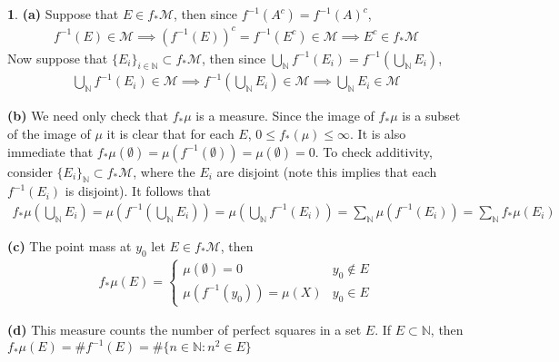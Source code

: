 \documentclass[10.5pt]{article}
\theoremstyle{definition}
\newtheorem{pb}{}
\newcommand{\set}[1]{\{#1\}}
\begin{document}
	\begin{pb}
		\textbf{(a)} Suppose that \(E \in f_* \mathcal{M}\), then since \(f^{-1}(A^c) = f^{-1}(A)^c\),
		\begin{align*}
			f^{-1}(E) \in \mathcal{M} \implies (f^{-1}(E))^c = f^{-1}(E^c) \in \mathcal{M} \implies E^c \in f_* \mathcal{M}
		\end{align*}
		Now suppose that \(\set{E_i}_{i \in \mathbb{N}} \subset f_* \mathcal{M}\), then since \(\bigcup_\mathbb{N} f^{-1}(E_i) = f^{-1}(\bigcup_\mathbb{N} E_i)\),
		\begin{align*}
			\bigcup_\mathbb{N} f^{-1}(E_i) \in \mathcal{M} \implies f^{-1}(\bigcup_\mathbb{N} E_i) \in \mathcal{M} \implies \bigcup_\mathbb{N} E_i \in \mathcal{M}
		\end{align*}

		\textbf{(b)} We need only check that \(f_*\mu\) is a measure. Since the image of \(f_*\mu\) is a subset of the image of \(\mu\) it is clear 
		that for each \(E\), \(0 \leq f_*(\mu) \leq \infty\). It is also immediate that \(f_*\mu(\emptyset) = \mu(f^{-1}(\emptyset)) = \mu(\emptyset) = 0\).
        To check additivity, consider \(\set{E_i}_\mathbb{N}\subset f_*\mathcal{M}\), where the \(E_i\) 
		are disjoint (note this implies that each \(f^{-1}(E_i)\) is disjoint). It follows that
		\begin{align*}
			f_*\mu(\bigcup_\mathbb{N} E_i) = \mu(f^{-1}(\bigcup_\mathbb{N} E_i)) = \mu(\bigcup_\mathbb{N} f^{-1}(E_i)) = \sum_\mathbb{N} \mu(f^{-1}(E_i)) = \sum_\mathbb{N} f_*\mu(E_i)
		\end{align*}

		\textbf{(c)} The point mass at \(y_0\) let \(E \in f_*\mathcal{M}\), then
		\begin{align*}
			f_*\mu(E) = \begin{cases}
				\mu(\emptyset) = 0 & y_0 \not \in E \\
				\mu(f^{-1}(y_0)) = \mu(X) & y_0 \in E
			\end{cases}
		\end{align*}

		\textbf{(d)} This measure counts the number of perfect squares in a set \(E\). If \(E \subset \mathbb{N}\), then
		\(f_*\mu(E) = \# f^{-1}(E) = \# \set{n \in \mathbb{N}: n^2 \in E}\)
	\end{pb}
\end{document}
